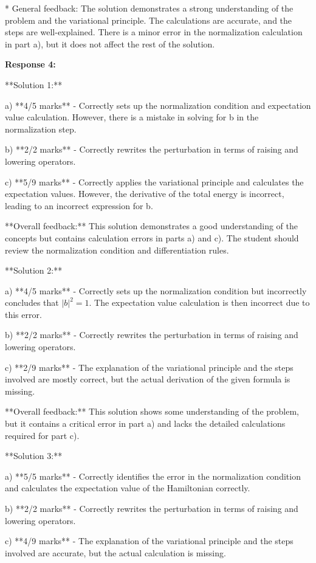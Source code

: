 \documentclass[a4paper,11pt]{article}
\begin{document}
* General feedback: The solution demonstrates a strong understanding of the problem and the variational principle. The calculations are accurate, and the steps are well-explained. There is a minor error in the normalization calculation in part a), but it does not affect the rest of the solution.

\textbf{Response 4:}

**Solution 1:**

a) **4/5 marks** - Correctly sets up the normalization condition and expectation value calculation. However, there is a mistake in solving for b in the normalization step.

b) **2/2 marks** - Correctly rewrites the perturbation in terms of raising and lowering operators.

c) **5/9 marks** - Correctly applies the variational principle and calculates the expectation values. However, the derivative of the total energy is incorrect, leading to an incorrect expression for b.

**Overall feedback:** This solution demonstrates a good understanding of the concepts but contains calculation errors in parts a) and c). The student should review the normalization condition and differentiation rules.

**Solution 2:**

a) **4/5 marks** - Correctly sets up the normalization condition but incorrectly concludes that \( |b|^2 = 1 \). The expectation value calculation is then incorrect due to this error.

b) **2/2 marks** - Correctly rewrites the perturbation in terms of raising and lowering operators.

c) **2/9 marks** -  The explanation of the variational principle and the steps involved are mostly correct, but the actual derivation of the given formula is missing.

**Overall feedback:** This solution shows some understanding of the problem, but it contains a critical error in part a) and lacks the detailed calculations required for part c).

**Solution 3:**

a) **5/5 marks** - Correctly identifies the error in the normalization condition and calculates the expectation value of the Hamiltonian correctly.

b) **2/2 marks** - Correctly rewrites the perturbation in terms of raising and lowering operators.

c) **4/9 marks** - The explanation of the variational principle and the steps involved are accurate, but the actual calculation is missing.
\end{document}
